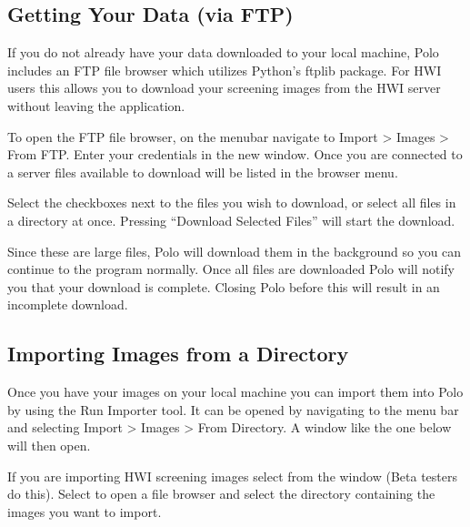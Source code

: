 \documentclass[letterpaper,10pt,english]{sphinxmanual}
\begin{document}
\subsection{Getting Your Data (via FTP)}
\label{\detokenize{user_guide:getting-your-data-via-ftp}}
If you do not already have your data downloaded to your local machine, Polo
includes an FTP file browser which utilizes Python’s ftplib package. For
HWI users this allows you to download your screening images from the
HWI server without leaving the application.

To open the FTP file browser, on the menubar navigate to Import \sphinxhyphen{}\textgreater{} Images
\sphinxhyphen{}\textgreater{} From FTP. Enter your credentials in the new window. Once you are
connected to a server files available to download will be listed in the browser menu.


Select the checkboxes next to the files you wish to download, or select
all files in a directory at once. Pressing “Download Selected Files”
will start the download.

Since these are large files, Polo will download them in the background so you
can continue to the program normally. Once all files are downloaded Polo will
notify you that your download is complete. Closing Polo before this will
result in an incomplete download.


\subsection{Importing Images from a Directory}
\label{\detokenize{user_guide:importing-images-from-a-directory}}
Once you have your images on your local machine you can import them into
Polo by using the Run Importer tool. It can be opened by navigating to the
menu bar and selecting Import \sphinxhyphen{}\textgreater{} Images \sphinxhyphen{}\textgreater{} From Directory. A window like
the one below will then open.

\noindent{}

If you are importing HWI screening images select  from
the  window (Beta testers do this). Select  to open
a file browser and select the directory containing the images you want to
import.
\end{document}
